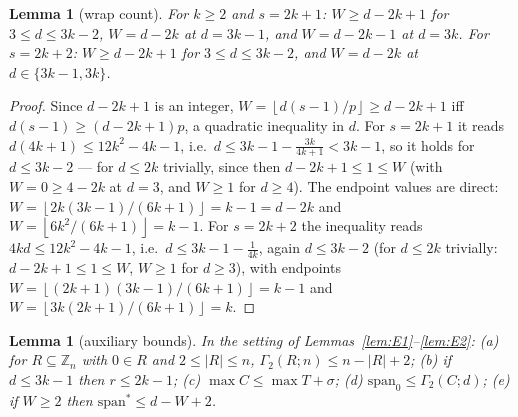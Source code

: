 \documentclass[11pt,a4paper]{article}
\numberwithin{equation}{section}
\theoremstyle{plain}
\theoremstyle{plain}
\newtheorem{lemma}[theorem]{Lemma}
\theoremstyle{definition}
\theoremstyle{remark}
\newcommand{\Z}{\mathbb{Z}}
\newcommand{\floor}[1]{\left\lfloor #1 \right\rfloor}
\begin{document}
\begin{lemma}[wrap count]\label{lem:E3}
For $k\ge2$ and $s=2k{+}1$: $W\ge d-2k+1$ for $3\le d\le3k-2$, $W=d-2k$
at $d=3k-1$, and $W=d-2k-1$ at $d=3k$. For $s=2k{+}2$: $W\ge d-2k+1$
for $3\le d\le3k-2$, and $W=d-2k$ at $d\in\{3k-1,3k\}$.
\end{lemma}

\begin{proof}
Since $d-2k+1$ is an integer, $W=\floor{d(s-1)/p}\ge d-2k+1$ iff
$d(s-1)\ge(d-2k+1)p$, a quadratic inequality in $d$. For $s=2k+1$ it
reads $d(4k+1)\le12k^2-4k-1$, i.e.\
$d\le3k-1-\frac{3k}{4k+1}<3k-1$, so it holds for $d\le3k-2$ --- for
$d\le2k$ trivially, since then $d-2k+1\le1\le W$ (with $W=0\ge4-2k$ at
$d=3$, and $W\ge1$ for $d\ge4$). The endpoint values are direct:
$W=\floor{2k(3k-1)/(6k+1)}=k-1=d-2k$ and $W=\floor{6k^2/(6k+1)}=k-1$.
For $s=2k+2$ the inequality reads $4kd\le12k^2-4k-1$, i.e.\
$d\le3k-1-\frac1{4k}$, again $d\le3k-2$ (for $d\le2k$ trivially:
$d-2k+1\le1\le W$, $W\ge1$ for $d\ge3$), with endpoints
$W=\floor{(2k+1)(3k-1)/(6k+1)}=k-1$ and
$W=\floor{3k(2k+1)/(6k+1)}=k$.
\end{proof}

\begin{lemma}[auxiliary bounds]\label{lem:E4}
In the setting of Lemmas~\ref{lem:E1}--\ref{lem:E2}:
\textup{(a)} for $R\subseteq\Z_n$ with $0\in R$ and $2\le|R|\le n$,
$\Gamma_2(R;n)\le n-|R|+2$;
\textup{(b)} if $d\le3k-1$ then $r\le2k-1$;
\textup{(c)} $\max C\le\max T+\sigma$;
\textup{(d)} $\mathrm{span}_0\le\Gamma_2(C;d)$;
\textup{(e)} if $W\ge2$ then $\mathrm{span}^\ast\le d-W+2$.
\end{lemma}
\end{document}
